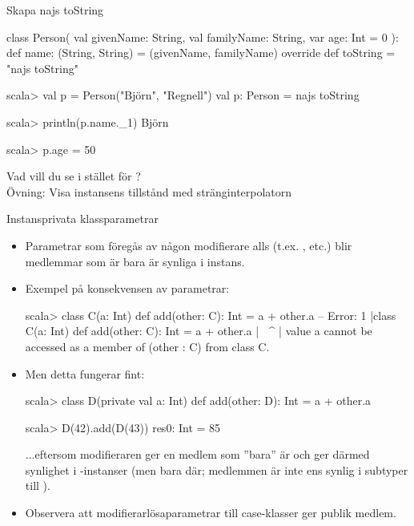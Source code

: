 \begin{Slide}{Skapa najs toString}
\begin{Code}[basicstyle=\SlideFontSize{6.9}{9}\ttfamily]
class Person(
  val givenName: String, 
  val familyName: String, 
  var age: Int = 0
):
  def name: (String, String) = (givenName, familyName)
  override def toString = "najs toString"
\end{Code}
\begin{REPLnonum}[basicstyle=\SlideFontSize{7}{9}\ttfamily\color{white}]
scala> val p = Person("Björn", "Regnell")
val p: Person = najs toString

scala> println(p.name._1)
Björn

scala> p.age = 50 

\end{REPLnonum}
Vad vill du se i stället för ?\\Övning: Visa instansens tillstånd med stränginterpolatorn  
\end{Slide}

\begin{Slide}{Instansprivata klassparametrar}\SlideFontSmall
\setlength{\leftmargini}{0pt}

\begin{itemize}
\item Parametrar som  föregås av någon modifierare alls (t.ex. ,  etc.) blir medlemmar som är bara är synliga i  instans.
\item Exempel på konsekvensen av  parametrar:
\begin{REPL}[basicstyle=\SlideFontSize{6.7}{9}\ttfamily\color{white}]
scala> class C(a: Int){ def add(other: C): Int = a + other.a }
-- Error:
1 |class C(a: Int){ def add(other: C): Int = a + other.a }
  |                                              ^^^^^^^
  | value a cannot be accessed as a member of (other : C) from class C.
\end{REPL}
\item Men detta fungerar fint:
\begin{REPL}
scala> class D(private val a: Int){ def add(other: D): Int = a + other.a }

scala> D(42).add(D(43))
res0: Int = 85
\end{REPL}
...eftersom modifieraren  ger en medlem som ''bara'' är  och ger därmed synlighet i  -instanser (men bara där; medlemmen är inte ens synlig i subtyper till ).
\item Observera att modifierarlösaparametrar till case-klasser ger publik medlem.
\end{itemize}
\end{Slide}


